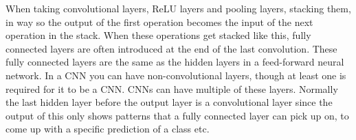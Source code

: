When taking convolutional layers, ReLU layers and pooling layers, stacking them, in way so the output of the first operation becomes the input of the next operation in the stack. When these operations get stacked like this, fully connected layers are often introduced at the end of the last convolution. These fully connected layers are the same as the hidden layers in a feed-forward neural network. In a CNN you can have non-convolutional layers, though at least one is required for it to be a CNN. CNNs can have multiple of these layers. Normally the last hidden layer before the output layer is a convolutional layer since the output of this only shows patterns that a fully connected layer can pick up on, to come up with a specific prediction of a class etc.
